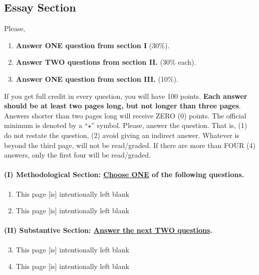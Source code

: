 \documentclass{article}
\begin{document}
\subsection*{Essay Section}

Please, 

\begin{enumerate}
    \item {\bf Answer ONE question from section I} (30\%).
    \item {\bf Answer TWO questions from section II.} (30\% each).
    \item {\bf Answer ONE question from section III.} (10\%).
\end{enumerate}

If you get full credit in every question, you will have 100 points. {\bf Each answer should be at least two pages long, but not longer than three pages}. Answers shorter than two pages long will receive ZERO (0) points. The official minimum is denoted by a ``$\star$'' symbol. Please, answer the question. That is, (1) do not restate the question, (2) avoid giving an indirect answer. Whatever is beyond the third page, will not be read/graded. If there are more than FOUR (4) answers, only the first four will be read/graded.


\paragraph{(I) Methodological Section: \underline{Choose ONE} of the following questions.}


\begin{enumerate}
    \item This page [is] intentionally left blank{\unskip} 
    
    \item This page [is] intentionally left blank{\unskip} 
\end{enumerate}




\paragraph{(II) Substantive Section: \underline{Answer the next TWO questions}.}


\begin{enumerate}  \setcounter{enumi}{2}
    \item This page [is] intentionally left blank{\unskip} 
    \item This page [is] intentionally left blank{\unskip} 
\end{enumerate}
\end{document}

